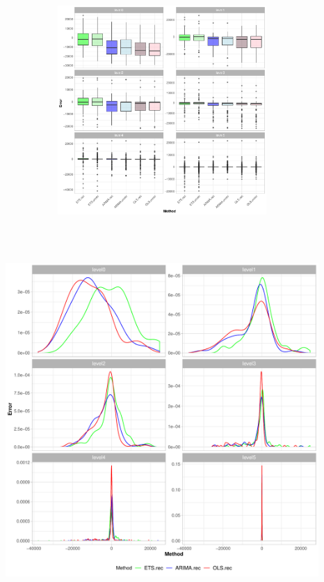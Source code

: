 \documentclass[11pt,a4paper,]{article}
\let\origfigure\figure
\let\endorigfigure\endfigure
\renewenvironment{figure}[1][2] {
    \expandafter\origfigure\expandafter[htbp]
} {
    \endorigfigure
}
\begin{document}
\begin{figure}

{\centering \includegraphics[width=450px,height=300px]{Paper-Figures/results_Wikipedia/boxplot_1} 

}

\caption{Box plot for forecast errors -  Reconciled and unreconciled ETS, ARIMA and OLS in each hierarchy level for 1-step-ahead Wikipedia pageviews}\label{fig:boxplotrollingwiki}
\end{figure}

\begin{figure}

{\centering \includegraphics[width=450px,height=550px]{Paper-Figures/results_Wikipedia/densityplot_1} 

}

\caption{Density plot for forecast errors -  Reconciled and unreconciled ETS, ARIMA and OLS in each hierarchy level for 1-step-ahead Wikipedia pageviews}\label{fig:densityplotrollingwiki}
\end{figure}
\end{document}
